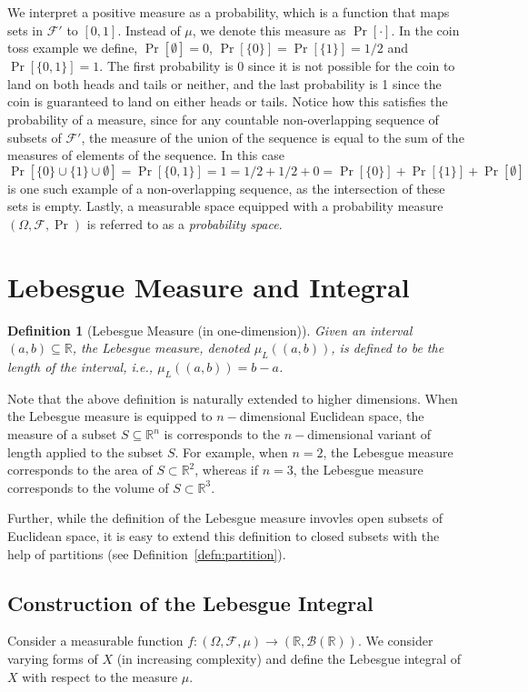 \documentclass[10pt, oneside]{article}
\newcommand{\R}{\mathbb{R}}
\newtheorem{defn}{Definition}
\begin{document}
We interpret a positive measure as a probability, which is a function that maps sets in $\mathcal{F}'$ to $[0,1]$.
Instead of $\mu$, we denote this measure as $\Pr[\cdot]$.
In the coin toss example we define, $\Pr[\emptyset]=0$, $\Pr[\{0\}]=\Pr[\{1\}]=1/2$ and $\Pr[\{0,1\}]=1$.
The first probability is 0 since it is not possible for the coin to land on both heads and tails or neither, and the last probability is 1 since the coin is guaranteed to land on either heads or tails.
Notice how this satisfies the probability of a measure, since for any countable non-overlapping sequence of subsets of $\mathcal{F}'$, the measure of the union of the sequence is equal to the sum of the measures of elements of the sequence. In this case
$$\Pr[\{0\}\cup\{1\}\cup\emptyset]=\Pr[\{0,1\}]=1=1/2+1/2+0=\Pr[\{0\}]+\Pr[\{1\}]+\Pr[\emptyset]$$
is one such example of a non-overlapping sequence, as the intersection of these sets is empty.
Lastly, a measurable space equipped with a probability measure $(\Omega,\mathcal{F},\Pr)$ is referred to as a \emph{probability space}.

\section{Lebesgue Measure and Integral}
\label{sec:lebesgue}
\begin{defn}[Lebesgue Measure (in one-dimension)]
    Given an interval $(a,b) \subseteq \R$, the Lebesgue measure, denoted $\mu_L((a,b))$, 
    is defined to be the length of the interval, i.e., $\mu_L((a,b)) = b-a$. 
\end{defn}
Note that the above definition is naturally extended to higher dimensions. When the 
Lebesgue measure is equipped to $n-$dimensional Euclidean space, the measure of a subset 
$S \subseteq \R^{n}$ is corresponds to the $n-$dimensional variant of length applied to 
the subset $S$. For example, when $n=2$, the Lebesgue measure corresponds to the area of 
$S \subset \R^2$, whereas if $n=3$, the Lebesgue measure corresponds to the volume of $S
\subset \R^3$. 

Further, while the definition of the Lebesgue measure invovles open subsets of Euclidean 
space, it is easy to extend this definition to closed subsets with the help of partitions
(see Definition~\ref{defn:partition}).  

\subsection{Construction of the Lebesgue Integral}
Consider a measurable function $f \colon (\Omega, \mathcal{F}, \mu) \to (\R,\mathcal{B}(\R))$. 
We consider varying forms of $X$ (in increasing complexity) and define the Lebesgue integral 
of $X$ with respect to the measure $\mu$. 
\end{document}
